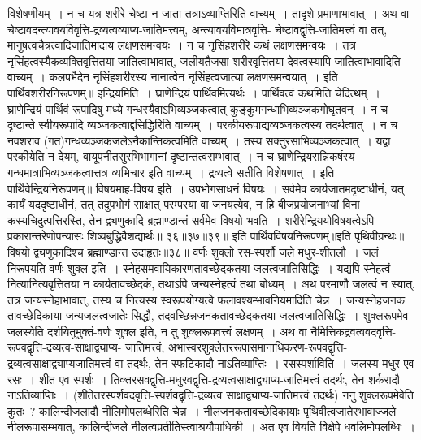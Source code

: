 विशेषणीयम्~। न च यत्र शरीरे चेष्टा न जाता तत्राऽव्याप्तिरिति वाच्यम्~। तादृशे प्रमाणाभावात्~। अथ वा चेष्टावदन्त्यावयविवृत्ति-द्रव्यत्वव्याप्य-जातिमत्त्वम्, अन्त्यावयविमात्रवृत्ति-
चेष्टावद्वृत्ति-जातिमत्त्वं वा तत्, मानुषत्वचैत्रत्वादिजातिमादाय लक्षणसमन्वयः~। न च नृसिंहशरीरे कथं लक्षणसमन्वयः~। तत्र नृसिंहत्वस्यैकव्यक्तिवृत्तितया जातित्वाभावात्,
जलीयतैजसा शरीरवृत्तितया देवत्वस्यापि जातित्वाभावादिति वाच्यम्~। कलपभैदेन नृसिंहशरीरस्य नानात्वेन नृसिंहत्वजात्या लक्षणसमन्वयात्~।
इति पार्थिवशरीरनिरूपणम्॥
इन्द्रियमिति~। घ्राणेन्द्रियं पार्थिवमित्यर्थः~। पार्थिवत्वं कथमिति चेदित्थम्~। घ्राणेन्द्रियं पार्थिवं रूपादिषु मध्ये गन्धस्यैवाऽभिव्यञ्जकत्वात् कुङ्कुमगन्धाभिव्यञ्जकगोघृतवन्~।
न च दृष्टान्ते स्वीयरूपादि व्यञ्जकत्वाद्दसिद्धिरिति वाच्यम्~। परकीयरूपाद्यव्यञ्जकत्वस्य तदर्थत्वात्~। न च नवशराव (गत)गन्धव्यञ्जकजलेऽनैकान्तिकत्वमिति
वाच्यम्~। तस्य सक्तुरसाभिव्यञ्जकत्वात्~। यद्वा परकीयेति न देयम्, वायूपनीतसुरभिभागानां दृष्टान्तत्वसम्भवात्~। न च घ्राणेन्द्रियसन्निकर्षस्य गन्धमात्राभिव्यञ्जकत्वात्तत्र
व्यभिचार इति वाच्यम्~। द्रव्यत्वे सतीति विशेषणात्~।
इति पार्थिवेन्द्रियनिरूपणम्॥
विषयमाह-विषय इति~। उपभोगसाधनं विषयः~। सर्वमेव कार्यजातमदृष्टाधीनं, यत् कार्यं यददृष्टाधीनं, तत् तदुपभोगं साक्षात् परम्परया वा जनयत्येव, न हि
बीजप्रयोजनाभ्यां विना कस्यचिदुत्पत्तिरस्ति, तेन द्व्यणुकादि ब्रह्माण्डान्तं सर्वमेव विषयो भवति~। शरीरेन्द्रिययोविषयत्वेऽपि प्रकारान्तरेणोपन्यासः शिष्यबुद्धिवैशद्यार्थः॥
३६॥३७॥३९॥
इति पार्थिवविषयनिरूपणम्॥इति पृथिवीग्रन्थः॥
विषयो द्व्यणुकादिश्च ब्रह्माण्डान्त उदाहृतः॥३८॥
वर्णः शुक्लो रस-स्पर्शौ जले मधुर-शीतलौ~।
जलं निरूपयति-वर्णः शुक्ल इति~। स्नेहसमवायिकारणतावच्छेदकतया जलत्वजातिसिद्धिः~।
यद्यपि स्नेहत्वं नित्यानित्यवृत्तितया न कार्यतावच्छेदकं, तथाऽपि जन्यस्नेहत्वं तथा बोध्यम्~।
अथ परमाणौ जलत्वं न स्यात्, तत्र जन्यस्नेहाभावात्, तस्य च नित्यस्य स्वरूपयोग्यत्वे फलावश्यम्भावनियमादिति चेन्न~। जन्यस्नेहजनक
तावच्छेदिकाया जन्यजलत्वजातेः सिद्धौ, तदवच्छिन्नजनकतावच्छेदकतया जलत्वजातिसिद्धिः~।
शुक्लरूपमेव जलस्येति दर्शयितुमुक्तं-वर्णः शुक्ल इति, न तु शुक्लरूपवत्त्वं लक्षणम्~। अथ वा नैमित्तिकद्रवत्ववदवृत्ति-रूपवद्वृत्ति-द्रव्यत्व-साक्षाद्व्याप्य-
जातिमत्त्वं, अभास्वरशुक्लेतररूपासमानाधिकरण-रूपवद्वृत्ति-द्रव्यत्वसाक्षाद्व्याप्यजातिमत्त्वं वा तदर्थः, तेन स्फटिकादौ नाऽतिव्याप्तिः~।
रसस्पर्शाविति~। जलस्य मधुर एव रसः~। शीत एव स्पर्शः~। तिक्तरसवद्वृत्ति-मधुरवद्वृत्ति-द्रव्यत्वसाक्षाद्व्याप्य-जातिमत्त्वं तदर्थः, तेन शर्करादौ नाऽतिव्याप्तिः~।
(शीतेतरस्पर्शवदवृत्ति-स्पर्शवद्वृत्ति-द्रव्यत्व साक्षाद्व्याप्य-जातिमत्त्वं तदर्थः)
ननु शुक्लरूपमेवेति कुतः~? कालिन्दीजलादौ नीलिमोपलब्धेरिति चेन्न~। नीलजनकतावच्छेदिकायाः पृथिवीत्वजातेरभावाज्जले नीलरूपासम्भवात्, कालिन्दीजले
नीलत्वप्रतीतिस्त्वाश्रयौपाधिकी~। अत एव वियति विक्षेपे धवलिमोपलब्धिः~।
